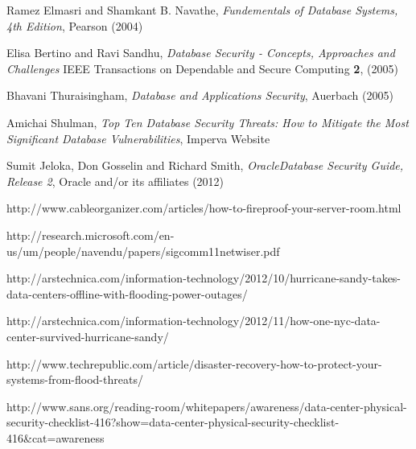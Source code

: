 \documentclass[11pt]{article}
\begin{document}
\begin{thebibliography}{}

  Ramez Elmasri and Shamkant B. Navathe, {\it Fundementals of Database Systems, 4th Edition}, Pearson (2004)

  Elisa Bertino and Ravi Sandhu, {\it Database Security - Concepts, Approaches and Challenges} IEEE Transactions on Dependable and Secure Computing {\bf 2},  (2005)

  Bhavani Thuraisingham, {\it Database and Applications Security}, Auerbach (2005)

  Amichai Shulman, {\it Top Ten Database Security Threats: How to Mitigate the Most Significant Database Vulnerabilities}, Imperva Website

  Sumit Jeloka, Don Gosselin and Richard Smith, {\it Oracle\textregistered Database Security Guide, Release 2}, Oracle and/or its affiliates (2012)

  http://www.cableorganizer.com/articles/how-to-fireproof-your-server-room.html

  http://research.microsoft.com/en-us/um/people/navendu/papers/sigcomm11netwiser.pdf


  http://arstechnica.com/information-technology/2012/10/hurricane-sandy-takes-data-centers-offline-with-flooding-power-outages/

  http://arstechnica.com/information-technology/2012/11/how-one-nyc-data-center-survived-hurricane-sandy/

  http://www.techrepublic.com/article/disaster-recovery-how-to-protect-your-systems-from-flood-threats/

  http://www.sans.org/reading-room/whitepapers/awareness/data-center-physical-security-checklist-416?show=data-center-physical-security-checklist-416\&cat=awareness


\end{thebibliography}
\end{document}
